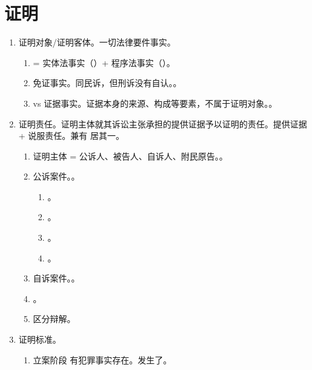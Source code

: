 \section{证明}
\begin{enumerate}
  \item 证明对象/证明客体。一切法律要件事实。
        \begin{enumerate}
          \item = 实体法事实（）+ 程序法事实（）。
          \item 免证事实。同民诉，但刑诉没有自认。。
          \item vs 证据事实。证据本身的来源、构成等要素，不属于证明对象。。
        \end{enumerate}
  \item 证明责任。证明主体就其诉讼主张承担的提供证据予以证明的责任。提供证据 + 说服责任。兼有 \hz 居其一。
        \begin{enumerate}
          \item 证明主体 = 公诉人、被告人、自诉人、附民原告。。
          \item 公诉案件。。
                \begin{enumerate}
                  \item {}。
                  \item {}。
                  \item {}。
                  \item {}。
                \end{enumerate}
          \item 自诉案件。。
          \item {}。
          \item 区分辩解。
        \end{enumerate}
  \item 证明标准。
        \begin{enumerate}
          \item 立案阶段 \yjt 有犯罪事实存在。发生了。

\end{enumerate}
\end{enumerate}
